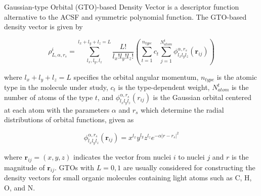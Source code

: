 Gaussian-type Orbital (GTO)-based Density Vector is a descriptor function alternative to 
the ACSF and symmetric polynomial function.\cite{kwac2021} The GTO-based density vector is given by

\begin{equation}
    \rho^{i}_{L,\alpha,r_{s}} = \sum^{l_{x}+l_{y}+l_{z} = L}_{l_{x},l_{y},l_{z}} 
    \frac{L!}{l_{x}!l_{y}!l_{z}!} \left ( \sum^{n_{type}}_{t=1} c_{t} \sum^{N^{t}_{atom}}_{j=1} 
    \phi^{\alpha,r_{s}}_{l_{x}l_{y}l_{z}} (\boldsymbol{r}_{ij}) \right )
\end{equation}

\noindent where $l_{x}+l_{y}+l_{z} = L$ specifies the orbital angular momentum, $n_{type}$ is the atomic type 
in the molecule under study, $c_{t}$ is the type-dependent weight, $N^{t}_{atom}$ is the number of atoms of 
the type $t$, and $\phi^{\alpha,r_{s}}_{l_{x}l_{y}l_{z}} (r_{ij})$ is the Gaussian orbital centered at 
each atom with the parameters $\alpha$ and $r_{s}$ which determine the radial distributions of orbital functions, 
given as

\begin{equation}
    \phi^{\alpha,r_{s}}_{l_{x}l_{y}l_{z}} (\boldsymbol{r}_{ij}) = x^{l_{x}}y^{l_{y}}z^{l_{z}} e^{-\alpha 
    |r-r_{s}|^{2}}
\end{equation}

\noindent where $\boldsymbol{r}_{ij} = (x,y,z)$ indicates the vector from nuclei $i$ to nuclei $j$ and $r$ 
is the magnitude of $\boldsymbol{r}_{ij}$. GTOs with $L=0,1$ are usually considered for constructing 
the density vectors for small organic molecules containing light atoms such as C, H, O, and N.\cite{kwac2021}

